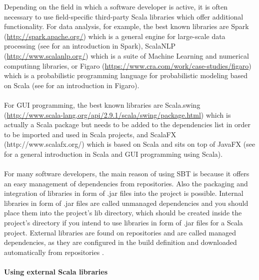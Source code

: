 \documentclass {article}
\begin{document}
Depending on the field in which a software developer is active, it is often necessary to use field-specific third-party Scala libraries which offer additional functionality.
 For data analysis, for example, the best known libraries are Spark (\href{http://spark.apache.org/}{http://spark.apache.org/}) which is a general engine for large-scale data processing (see \cite{karau_learning_2015} for an introduction in Spark), ScalaNLP (\href{http://www.scalanlp.org/}{http://www.scalanlp.org/}) which is a suite of Machine Learning and numerical computinng libraries, or Figaro (\href{https://www.cra.com/work/case-studies/figaro}{https://www.cra.com/work/case-studies/figaro}) which is a probabilistic programming language for probabilistic modeling based on Scala (see \cite{pfeffer_practical_2016} for an introduction in Figaro). 
\\
\\
For GUI programming, the best known libraries are Scala.swing (\href{http://www.scala-lang.org/api/2.9.1/scala/swing/package.html}{http://www.scala-lang.org/api/2.9.1/scala/swing/package.html}) which is actually a Scala package but needs to be added to the dependencies list in order to be imported and used in Scala projects, and ScalaFX (http://www.scalafx.org/) which is based on Scala and sits on top of JavaFX \cite{lewis_introduction_2017} (see \cite{lewis_introduction_2017} for a general introduction in Scala and GUI programming using Scala).   
\\
\\
For many software developers, the main reason of using SBT is because it offers an easy management of dependencies from repositories.
 Also the packaging and integration of libraries in form of .jar files into the project is possible.
 Internal libraries in form of .jar files are called unmanaged dependencies and you should place them into the project's lib directory, which should be created inside the project's directory if you intend to use libraries in form of .jar files for a Scala project.
 External libraries are found on repositories and are called managed dependencies, as they are configured in the build definition and downloaded automatically from repositories \cite{noauthor_sbt_2017}.  

\paragraph {Using external Scala libraries}
\end{document}
